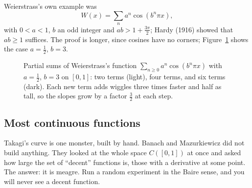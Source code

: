 Weierstrass's own example was
\[W(x)=\sum_na^n\cos(b^n\pi x),\]
with $0<a<1$, $b$ an odd integer and $ab>1+\frac{3\pi}2$; Hardy (1916) showed that $ab\ge1$ suffices. The
proof is longer, since cosines have no corners; Figure~\ref{fig:weierstrass} shows the case $a=\frac12$, $b=3$.

\begin{figure}[ht]
\centering
{}
\caption{Partial sums of Weierstrass's function $\sum_{n\ge0}a^n\cos(b^n\pi x)$ with $a=\frac12$, $b=3$ on $[0,1]$: two terms (light), four terms, and six terms (dark). Each new
term adds wiggles three times faster and half as tall, so the slopes grow by a factor $\frac32$ at each step.}
\label{fig:weierstrass}
\end{figure}



\subsection*{Most continuous functions}

Takagi's curve is one monster, built by hand. Banach and Mazurkiewicz did not build anything. They looked at the whole space
$C([0,1])$ at once and asked how large the set of ``decent'' functions is, those with a derivative at some point. The answer:
it is meagre. Run a random experiment in the Baire sense, and you will never see a decent function.


